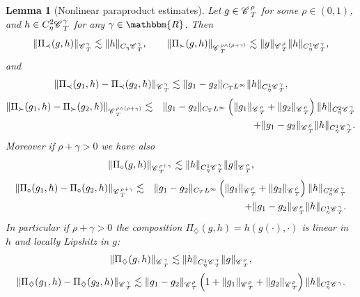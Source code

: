 \documentclass[11pt,reqno]{amsart}
\newtheorem{lemma}[theorem]{Lemma}
\newcommand{\CC}{\mathscr{C} \hspace{.1em}}
\begin{document}
\begin{lemma}[Nonlinear paraproduct estimates]
  \label{l:decomp-est} Let $g \in \CC_T^{\rho}$ for some $\rho \in (0, 1)$,
  and $h \in C^2_{\eta} \CC_T^{\gamma}$ for any $\gamma \in \mathbbm{R}$. Then
  \[ \| \Pi_{\prec} (g, h) \|_{\CC^{\gamma}_T} \lesssim \| h \|_{C_{\eta}
     \CC^{\gamma}_T}, \qquad \| \Pi_{\succ} (g, h) \|_{\CC^{\rho \wedge (\rho
     + \gamma)}_T} \lesssim \| g \|_{\CC^{\rho}_T} \| h \|_{C_{\eta}^1
     \CC^{\gamma}_T}, \]
  and
  \[ \| \Pi_{\prec} (g_1, h) - \Pi_{\prec} (g_2, h) \|_{\CC^{\gamma}_T}
     \lesssim \| g_1 - g_2 \|_{C_T L^{\infty}} \| h \|_{C_{\eta}^1
     \CC^{\gamma}_T}, \qquad \]
  \begin{eqnarray*}
    \| \Pi_{\succ} (g_1, h) - \Pi_{\succ} (g_2, h) \|_{\CC_T^{\rho \wedge
    (\rho + \gamma)}} & \lesssim & \| g_1 - g_2 \|_{C_T L^{\infty}} \left( \|
    g_1 \|_{\CC^{\rho}_T} + \| g_2 \|_{\CC^{\rho}_T} \right) \| h
    \|_{C_{\eta}^2 \CC^{\gamma}_T}\\
    &  & + \| g_1 - g_2 \|_{\CC^{\rho}_T} \| h \|_{C_{\eta}^1 \CC^{\gamma}_T}
    .
  \end{eqnarray*}
  Moreover if $\rho + \gamma > 0$ we have also
  \[ \| \Pi_{\circ} (g, h) \|_{\CC^{\rho + \gamma}_T} \lesssim \| h
     \|_{C_{\eta}^1 \CC^{\gamma}_T} \| g \|_{\CC^{\rho}_T}, \]
  \begin{eqnarray*}
    \| \Pi_{\circ} (g_1, h) - \Pi_{\circ} (g_2, h) \|_{\CC_T^{\rho + \gamma}}
    & \lesssim & \| g_1 - g_2 \|_{C_T L^{\infty}} \left( \| g_1
    \|_{\CC^{\rho}_T} + \| g_2 \|_{\CC^{\rho}_T} \right) \| h \|_{C_{\eta}^2
    \CC^{\gamma}_T}\\
    &  & + \| g_1 - g_2 \|_{\CC^{\rho}_T} \| h \|_{C_{\eta}^1 \CC^{\gamma}_T}
    .
  \end{eqnarray*}
  In particular if $\rho + \gamma > 0$ the composition $\Pi_{\diamondsuit} (g,
  h) = h (g (\cdot), \cdot)$ is linear in $h$ and locally Lipshitz in $g$:
  \[ \| \Pi_{\diamondsuit} (g, h) \|_{\CC_T^{\gamma}} \lesssim \| h
     \|_{C_{\eta}^1 \CC^{\gamma}_T} \| g \|_{\CC^{\rho}_T}, \]
  \[ \| \Pi_{\diamondsuit} (g_1, h) - \Pi_{\diamondsuit} (g_2, h)
     \|_{\CC_T^{\gamma}} \lesssim \| g_1 - g_2 \|_{\CC^{\rho}_T} \left( 1 + \|
     g_1 \|_{\CC^{\rho}_T} + \| g_2 \|_{\CC^{\rho}_T} \right) \| h
     \|_{C_{\eta}^2 \CC^{\gamma}} . \]
\end{lemma}
\end{document}

